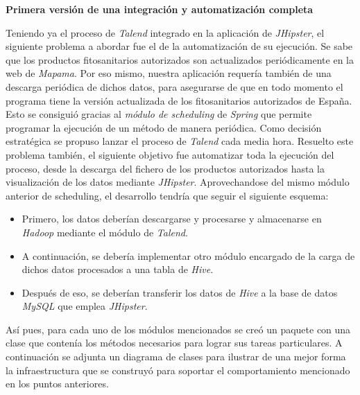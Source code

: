 \par 
\textbf{Primera versión de una integración y automatización completa}
\par
Teniendo ya el proceso de \textit{Talend} integrado en la aplicación de \textit{JHipster}, el siguiente problema a abordar fue el de la automatización de su ejecución. Se sabe que los productos fitosanitarios autorizados son actualizados periódicamente en la web de \textit{Mapama}. Por eso mismo, nuestra aplicación requería también de una descarga periódica de dichos datos, para asegurarse de que en todo momento el programa tiene la versión actualizada de los fitosanitarios autorizados de España. Esto se consiguió gracias al \textit{módulo de scheduling}\cite{spring_scheduling} de \textit{Spring} que permite programar la ejecución de un método de manera periódica. Como decisión estratégica se propuso lanzar el proceso de \textit{Talend} cada media hora. Resuelto este problema también, el siguiente objetivo fue automatizar toda la ejecución del proceso, desde la descarga del fichero de los productos autorizados hasta la visualización de los datos mediante \textit{JHipster}. Aprovechandose del mismo módulo anterior de scheduling, el desarrollo tendría que seguir el siguiente esquema: 
\begin{itemize}
\item Primero, los datos deberían descargarse y procesarse y almacenarse en \textit{Hadoop} mediante el módulo de \textit{Talend}.
\item A continuación, se debería implementar otro módulo encargado de la carga de dichos datos procesados a una tabla de \textit{Hive}.
\item Después de eso, se deberían transferir los datos de \textit{Hive} a la base de datos \textit{MySQL} que emplea \textit{JHipster}.
\end{itemize}
  \par Así pues, para cada uno de los módulos mencionados se creó un paquete con una clase que contenía los métodos necesarios para lograr sus tareas particulares. A continuación se adjunta un diagrama de clases para ilustrar de una mejor forma la infraestructura que se construyó para soportar el comportamiento mencionado en los puntos anteriores.



